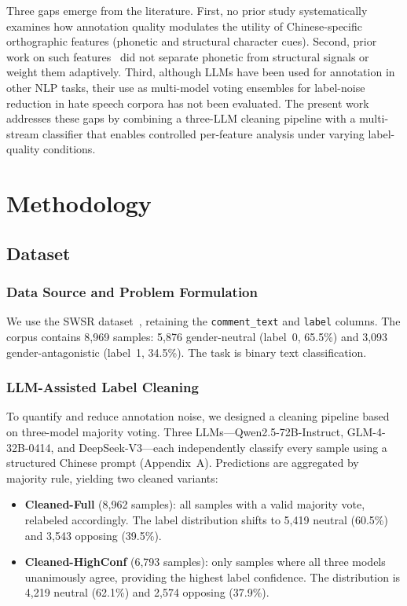 ﻿\documentclass[12pt]{article}
\begin{document}
Three gaps emerge from the literature. First, no prior study systematically examines how annotation quality modulates the utility of Chinese-specific orthographic features (phonetic and structural character cues). Second, prior work on such features~\cite{ma2024gender} did not separate phonetic from structural signals or weight them adaptively. Third, although LLMs have been used for annotation in other NLP tasks, their use as multi-model voting ensembles for label-noise reduction in hate speech corpora has not been evaluated. The present work addresses these gaps by combining a three-LLM cleaning pipeline with a multi-stream classifier that enables controlled per-feature analysis under varying label-quality conditions.

\section{Methodology}

\subsection{Dataset}

\subsubsection{Data Source and Problem Formulation}
We use the SWSR dataset~\cite{jiang2022swsr}, retaining the \texttt{comment\_text} and \texttt{label} columns. The corpus contains 8{,}969 samples: 5{,}876 gender-neutral (label~0, 65.5\%) and 3{,}093 gender-antagonistic (label~1, 34.5\%). The task is binary text classification.

\subsubsection{LLM-Assisted Label Cleaning}
\label{sec:llm-cleaning}
To quantify and reduce annotation noise, we designed a cleaning pipeline based on three-model majority voting. Three LLMs---Qwen2.5-72B-Instruct, GLM-4-32B-0414, and DeepSeek-V3---each independently classify every sample using a structured Chinese prompt (Appendix~A). Predictions are aggregated by majority rule, yielding two cleaned variants:

\begin{itemize}
    \item \textbf{Cleaned-Full} (8{,}962 samples): all samples with a valid majority vote, relabeled accordingly. The label distribution shifts to 5{,}419 neutral (60.5\%) and 3{,}543 opposing (39.5\%).
    \item \textbf{Cleaned-HighConf} (6{,}793 samples): only samples where all three models unanimously agree, providing the highest label confidence. The distribution is 4{,}219 neutral (62.1\%) and 2{,}574 opposing (37.9\%).
\end{itemize}
\end{document}
